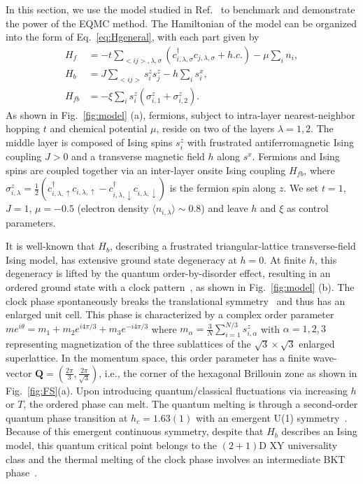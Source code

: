 \documentclass[aps,prx,twocolumn,superscriptaddress,showpacs,floatfix]{revtex4-1}
\begin{document}
In this section, we use the model studied in Ref.~\cite{ZHLiu2017} to benchmark and demonstrate the power of the EQMC method. The Hamiltonian of the model can be organized into the form of Eq.~\eqref{eq:Hgeneral}, with each part given by
\begin{align}
  \label{eq:HfM}
H_{f}&=-t\sum_{<ij>,\lambda,\sigma}(c^{\dagger}_{i,\lambda,\sigma}c_{j,\lambda,\sigma} +h.c.)-\mu\sum_{i}n_{i}, \\
\label{eq:HbM}
H_{b}&=J\sum_{<ij>}s^{z}_{i}s^{z}_{j}-h\sum_{i}s^{x}_{i}, \\
H_{fb}&=-\xi\sum_{i}s^{z}_{i}(\sigma^{z}_{i,1}+\sigma^{z}_{i,2}).
\end{align}
As shown in Fig.~\ref{fig:model} (a), fermions, subject to intra-layer nearest-neighbor hopping $t$ and chemical potential $\mu$, reside on two of the layers $\lambda=1,2$. The middle layer is composed of Ising spins $s^{z}_{i}$ with frustrated antiferromagnetic Ising coupling $J>0$ and a transverse magnetic field $h$ along $s^{x}$. Fermions and Ising spins are coupled together via an inter-layer onsite Ising coupling $H_{fb}$, where $\sigma^{z}_{i,\lambda}=\frac{1}{2}(c^{\dagger}_{i,\lambda,\uparrow}c_{i,\lambda,\uparrow}-c^{\dagger}_{i,\lambda,\downarrow}c_{i,\lambda,\downarrow})$ is the fermion spin along $z$. We set $t=1$, $J=1$, $\mu=-0.5$ (electron density $\langle n_{i,\lambda}\rangle \sim 0.8$) and leave $h$ and $\xi$ as control parameters.%

It is well-known that $H_{b}$, describing a frustrated triangular-lattice transverse-field Ising model, has extensive ground state degeneracy at $h=0$. At finite $h$, this degeneracy is lifted by the quantum order-by-disorder effect, resulting in an ordered ground state with a clock pattern~\cite{Moessner2001}, as shown in Fig.~\ref{fig:model} (b). The clock phase spontaneously breaks the translational symmetry~\cite{Isakov2003,YCWang2017} and thus has an enlarged unit cell. This phase is characterized by a complex order parameter $me^{i\theta}=m_{1}+m_{2}e^{i4\pi/3}+m_{3}e^{-i4\pi/3}$ where $m_{\alpha}=\frac{3}{N}\sum^{N/3}_{i=1} s^{z}_{i,\alpha}$ with $\alpha=1,2,3$ representing magnetization of the three sublattices of the $\sqrt{3}\times\sqrt{3}$ enlarged superlattice. In the momentum space, this order parameter has a finite wave-vector $\mathbf{Q}=(\frac{2\pi}{3},\frac{2\pi}{\sqrt{3}})$, i.e., the corner of the hexagonal Brillouin zone as shown in Fig.~\ref{fig:FS}(a). Upon introducing quantum/classical fluctuations via increasing $h$ or $T$, the ordered phase can melt. The quantum melting is through a second-order quantum phase transition at $h_c=1.63(1)$ with an emergent U(1) symmetry~\cite{YCWang2017}. Because of this emergent continuous symmetry, despite that $H_{b}$ describes an Ising model, this quantum critical point belongs to the $(2+1)$D XY universality class and the thermal melting of the clock phase involves an intermediate BKT phase~\cite{YCWang2017}.
\end{document}
